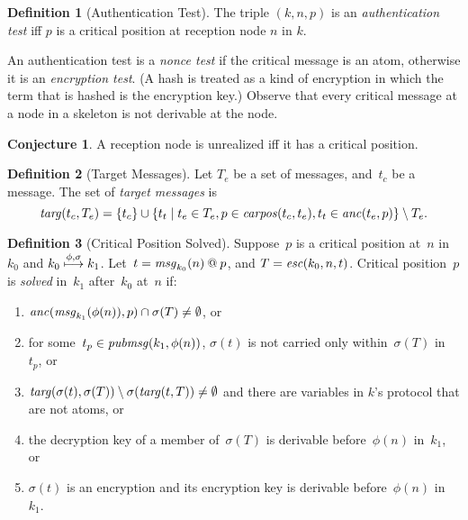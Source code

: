 \documentclass[12pt]{report}
\theoremstyle{definition}
\newtheorem{defn}{Definition}[chapter]
\newtheorem{conj}[thm]{Conjecture}
\newcommand{\pubmsg}{\fn{pubmsg}}
\newcommand{\msg}{\fn{msg}}
\begin{document}
\begin{defn}[Authentication Test]\label{def:authentication test}
  The triple $(k,n,p)$ is an \emph{authentication test} iff $p$ is a critical position at
  reception node $n$ in $k$.
\end{defn}

An authentication test is a \emph{nonce test} if the
critical message is an atom, otherwise it is an \emph{encryption test}.  (A hash is treated as a
kind of encryption in which the term that is hashed is the encryption
key.)  Observe that every critical message at a node in a skeleton is
not derivable at the node.

\begin{conj}
A reception node is unrealized iff it has a critical position.
\end{conj}

\begin{defn}[Target Messages]
Let $T_e$ be a set of messages, and~$t_c$ be a message.  The set of
\emph{target messages} is
$$\operatorname{\mathit{targ}}(t_c,T_e)=\{t_c\}\cup\{t_t\mid t_e\in T_e,p\in\operatorname{\mathit{carpos}}(t_c, t_e),
t_t\in\operatorname{\mathit{anc}}(t_e,p)\}\setminus T_e.$$
\end{defn}

\begin{defn}[Critical Position Solved]\label{def:critical position solved}
Suppose~$p$ is a critical position at~$n$ in~$k_0$ and
$k_0\stackrel{\phi,\sigma}{\longmapsto}k_1$.  Let~$t=\msg_{k_0}(n)\termat p$,
 and $T=\operatorname{\mathit{esc}}(k_0,n,t)$.  Critical position~$p$ is
\emph{solved} in~$k_1$ after~$k_0$
at~$n$ if:
\begin{enumerate}
\item\label{item:anc}
  $\fn{anc}(\msg_{k_1}(\phi(n)),p)\cap\sigma(T)\neq\emptyset$, or
\item\label{item:aug} for some~$t_p\in\pubmsg(k_1,\phi(n))$,
  $\sigma(t)$ is not carried only within~$\sigma(T)$ in~$t_p$, or
\item\label{item:targs}
  $\operatorname{\mathit{targ}}(\sigma(t),\sigma(T))\setminus\sigma(\operatorname{\mathit{targ}}(t,T))\neq\emptyset$
  and there are variables in $k$'s protocol that are not atoms, or
\item\label{item:dec} the decryption key of a member of~$\sigma(T)$ is
  derivable before~$\phi(n)$ in~$k_1$, or
\item\label{item:enc} $\sigma(t)$ is an encryption and its encryption
  key is derivable before~$\phi(n)$ in~$k_1$.
\end{enumerate}
\end{defn}
\end{document}
